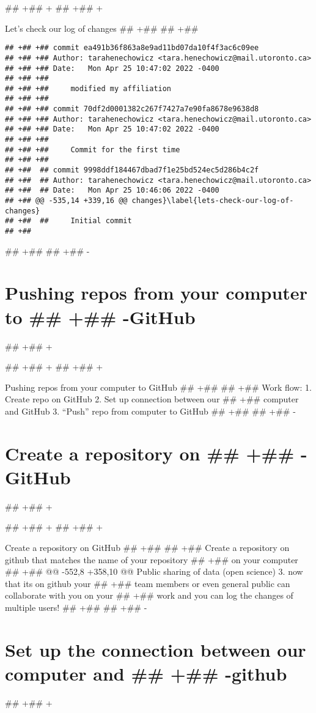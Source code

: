 \documentclass[ignorenonframetext,]{beamer}
\begin{document}
## +## +
## +## +\begin{frame}[fragile]{Let's check our log of changes}
## +##  
## +##  \begin{verbatim}
## +## +## commit ea491b36f863a8e9ad11bd07da10f4f3ac6c09ee
## +## +## Author: tarahenechowicz <tara.henechowicz@mail.utoronto.ca>
## +## +## Date:   Mon Apr 25 10:47:02 2022 -0400
## +## +## 
## +## +##     modified my affiliation
## +## +## 
## +## +## commit 70df2d0001382c267f7427a7e90fa8678e9638d8
## +## +## Author: tarahenechowicz <tara.henechowicz@mail.utoronto.ca>
## +## +## Date:   Mon Apr 25 10:47:02 2022 -0400
## +## +## 
## +## +##     Commit for the first time
## +## +## 
## +##  ## commit 9998ddf184467dbad7f1e25bd524ec5d286b4c2f
## +##  ## Author: tarahenechowicz <tara.henechowicz@mail.utoronto.ca>
## +##  ## Date:   Mon Apr 25 10:46:06 2022 -0400
## +## @@ -535,14 +339,16 @@ changes}\label{lets-check-our-log-of-changes}
## +##  ##     Initial commit
## +##  \end{verbatim}
## +##  
## +## -\section{Pushing repos from your computer to
## +## -GitHub}\label{pushing-repos-from-your-computer-to-github}
## +## +\end{frame}
## +## +
## +## +\begin{frame}{Pushing repos from your computer to GitHub}
## +##  
## +##  Work flow: 1. Create repo on GitHub 2. Set up connection between our
## +##  computer and GitHub 3. ``Push'' repo from computer to GitHub
## +##  
## +## -\section{Create a repository on
## +## -GitHub}\label{create-a-repository-on-github}
## +## +\end{frame}
## +## +
## +## +\begin{frame}{Create a repository on GitHub}
## +##  
## +##  Create a repository on github that matches the name of your repository
## +##  on your computer
## +## @@ -552,8 +358,10 @@ Public sharing of data (open science) 3. now that its on github your
## +##  team members or even general public can collaborate with you on your
## +##  work and you can log the changes of multiple users!
## +##  
## +## -\section{Set up the connection between our computer and
## +## -github}\label{set-up-the-connection-between-our-computer-and-github}
## +## +\end{frame}
\end{document}
